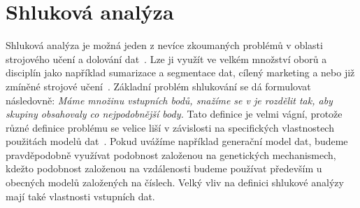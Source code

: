 \chapter{Shluková analýza} \label{sec:clusteranalysis}
Shluková analýza je možná jeden z nevíce zkoumaných problémů v oblasti strojového učení a dolování dat~\cite{Aggarwal13}. Lze ji využít ve velkém množství oborů a disciplín jako například sumarizace a segmentace dat, cílený marketing a nebo již zmíněné strojové učení~\cite{Jain10, Kaufman90}. Základní problém shlukování se dá formulovat následovně: \textit{Máme množinu vstupních bodů, snažíme se v je rozdělit tak, aby skupiny obsahovaly co nejpodobnější body.} Tato definice je velmi vágní, protože různé definice problému se velice liší v závislosti na specifických vlastnostech použitách modelů dat~\cite{Aggarwal13}. Pokud uvážíme například generační model dat, budeme pravděpodobně využívat podobnost založenou na genetických mechanismech, kdežto podobnost založenou na vzdálenosti budeme používat především u obecných modelů založených na číslech. Velký vliv na definici shlukové analýzy mají také vlastnosti vstupních dat.



